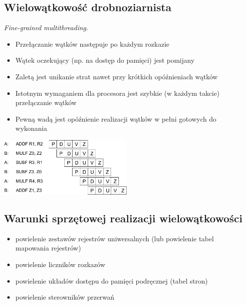 	\subsection{Wielowątkowość drobnoziarnista}
		\emph{Fine-grained multithreading}.
		\begin{itemize}
			\item Przełączanie wątków następuje po każdym rozkazie
			\item Wątek oczekujący (np. na dostęp do pamięci) jest pomijany
			\item Zaletą jest unikanie strat nawet przy krótkich opóźnieniach wątków
			\item Istotnym wymaganiem dla procesora jest szybkie (w każdym takcie) przełączanie wątków
			\item Pewną wadą jest opóźnienie realizacji wątków w pełni gotowych do wykonania
		\end{itemize}
		\begin{center}
			\vspace{0.3cm}
			\includegraphics[width=0.5\textwidth]{./images/wielowatkowosc02}
		\end{center}
	\subsection{Warunki sprzętowej realizacji wielowątkowości}
		\begin{itemize}
			\item powielenie zestawów rejestrów uniwersalnych (lub powielenie tabel mapowania rejestrów)
			\item powielenie liczników rozkazów
			\item powielenie układów dostępu do pamięci podręcznej (tabel stron)
			\item powielenie sterowników przerwań
		\end{itemize}
